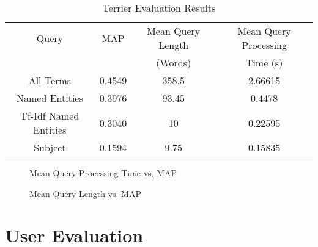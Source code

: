 \documentclass{l4proj}
\begin{document}
\begin{center}
\begin{table}[h]
\centering
\begin{tabular}{|c|c|c|c|}
\hline
Query                 & MAP    & Mean Query Length & Mean Query Processing \\ 
& & (Words) & Time (s) \\\hline
All Terms             & 0.4549 & 358.5             & 2.66615                        \\ \hline
Named Entities        & 0.3976 & 93.45             & 0.4478                         \\ \hline
Tf-Idf Named Entities & 0.3040 & 10                & 0.22595                        \\ \hline
Subject               & 0.1594 & 9.75              & 0.15835                        \\ \hline
\end{tabular}
\caption{Terrier Evaluation Results}
\label{results}
\end{table}
\end{center}
\begin{figure}[h]
\caption{Mean Query Processing Time vs. MAP} \label{fig: timegraph}
\end{figure}
\bigskip
\begin{figure}[h!]
\caption{Mean Query Length vs. MAP} \label{fig: lengthgraph}
\end{figure}










\section{User Evaluation}
\end{document}
